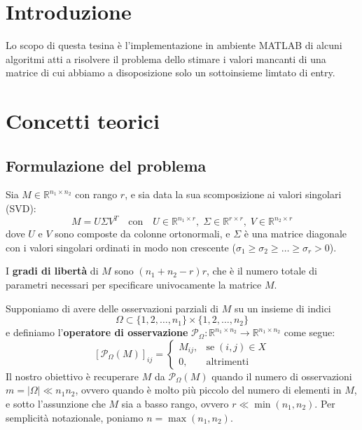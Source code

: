 \documentclass[12pt,a4paper]{report}
\begin{document}


\chapter{Introduzione}

Lo scopo di questa tesina è l'implementazione in ambiente MATLAB di alcuni algoritmi
atti a risolvere il problema dello stimare i valori mancanti di una matrice di cui
abbiamo a disoposizione solo un sottoinsieme limtato di entry.

{\let\clearpage\relax\chapter{Concetti teorici}}

\section{Formulazione del problema}

Sia $M\in\mathbb{R}^{n_1\times n_2}$ con rango $r$, e sia data la sua scomposizione ai valori
singolari (SVD):
$$M=U\Sigma V^T \quad\text{con}\quad U\in\mathbb{R}^{n_1\times r},
\;\Sigma\in\mathbb{R}^{r\times r},\;V\in\mathbb{R}^{n_2\times r}$$
dove $U$ e $V$ sono composte da colonne ortonormali, e $\Sigma$ è una matrice
diagonale con i valori singolari ordinati in modo non crescente
($\sigma_1\geq\sigma_2\geq\ldots\geq\sigma_r>0$).

I \textbf{gradi di libertà} di $M$ sono $(n_1 + n_2 - r)r$, che è il numero totale di parametri
necessari per specificare univocamente la matrice $M$.

\newpage

Supponiamo di avere delle osservazioni parziali di $M$ su un insieme di indici
$$\Omega \subset \{1,2,\ldots,n_1\}\times\{1,2,\ldots,n_2\}$$
e definiamo l'\textbf{operatore di osservazione}
$\mathcal{P}_{\Omega}:\mathbb{R}^{n_1\times n_2}\to\mathbb{R}^{n_1\times n_2}$ come segue:
$$\left[\mathcal{P}_{\Omega}(M)\right] _{ij}=\left\{\begin{matrix}M_{ij}, & \text{se}\; (i,j)\in X \\ 0, & \text{altrimenti}\end{matrix}\right.$$
Il nostro obiettivo è recuperare $M$ da $\mathcal{P}_{\Omega}(M)$
quando il numero di osservazioni\\ $m = |\Omega| \ll n_1 n_2$, ovvero quando
è molto più piccolo del numero di elementi in $M$, e sotto l'assunzione che $M$
sia a basso rango, ovvero $r\ll\min(n_1,n_2)$.
Per semplicità notazionale, poniamo $n=\max(n_1,n_2)$.
\end{document}
